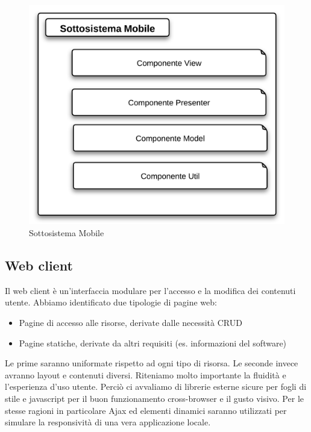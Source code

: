 \begin{figure}[H]
\centering
\includegraphics[scale=0.7]{images/cap2/Mobile/sottosistemaMobile.png} %
\caption{Sottosistema Mobile}
\end{figure}


\subsection{Web client}
Il web client è un'interfaccia modulare per l'accesso e la modifica dei contenuti utente. Abbiamo identificato due tipologie di pagine web:

\begin{itemize}
\item Pagine di accesso alle risorse, derivate dalle necessità CRUD
\item Pagine statiche, derivate da altri requisiti (es. informazioni del software)
\end{itemize}

Le prime saranno uniformate rispetto ad ogni tipo di risorsa. Le seconde invece avranno layout e contenuti diversi. Riteniamo molto importante la fluidità e l'esperienza d'uso utente. Perciò ci avvaliamo di librerie esterne sicure per fogli di stile e javascript per il buon funzionamento cross-browser e il gusto visivo. Per le stesse ragioni in particolare Ajax ed elementi dinamici saranno utilizzati per simulare la responsività di una vera applicazione locale.

